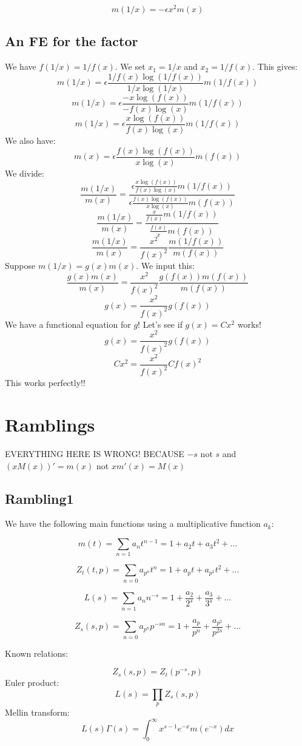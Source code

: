 \documentclass[a4paper]{amsart}
\begin{document}
$$m(1/x) = -\epsilon x^2 m(x)$$


\subsection{An FE for the factor}

We have $f(1/x) = 1/f(x)$. We set $x_1 = 1/x$ and $x_2 = 1/f(x)$. This gives:
$$m(1/x) = \epsilon\frac{1/f(x)\log(1/f(x))}{1/x\log(1/x)}m(1/f(x))$$
$$m(1/x) = \epsilon\frac{-x\log(f(x))}{-f(x)\log(x)}m(1/f(x))$$
$$m(1/x) = \epsilon\frac{x\log(f(x))}{f(x)\log(x)}m(1/f(x))$$
We also have:
$$m(x) = \epsilon\frac{f(x)\log(f(x))}{x\log(x)} m(f(x))$$
We divide:
$$\frac{m(1/x)}{m(x)} = \frac{\epsilon\frac{x\log(f(x))}{f(x)\log(x)}m(1/f(x))}{\epsilon\frac{f(x)\log(f(x))}{x\log(x)} m(f(x))}$$
$$\frac{m(1/x)}{m(x)} = \frac{\frac{x}{f(x)}m(1/f(x))}{\frac{f(x)}{x} m(f(x))}$$
$$\frac{m(1/x)}{m(x)} = \frac{x^2}{f(x)^2} \frac{m(1/f(x))}{m(f(x))}$$
Suppose $m(1/x) = g(x)m(x)$. We input this:
$$\frac{g(x)m(x)}{m(x)} = \frac{x^2}{f(x)^2} \frac{g(f(x))m(f(x))}{m(f(x))}$$
$$g(x) = \frac{x^2}{f(x)^2} g(f(x))$$
We have a functional equation for $g$! Let's see if $g(x) = Cx^2$ works!
$$g(x) = \frac{x^2}{f(x)^2} g(f(x))$$
$$Cx^2 = \frac{x^2}{f(x)^2} Cf(x)^2$$
This works perfectly!!

\section{Ramblings}

EVERYTHING HERE IS WRONG! BECAUSE $-s$ not $s$ and $(xM(x))' = m(x)$ not $xm'(x) = M(x)$


\subsection{Rambling1}

We have the following main functions using a multiplicative function $a_k$:

$$m(t) = \sum_{n = 1} a_nt^{n - 1} = 1 + a_2t + a_3t^2 + \ldots$$

$$Z_t(t, p) = \sum_{n = 0} a_{p^n} t^n = 1 + a_pt + a_{p^2}t^2 + \ldots$$

$$L(s) = \sum_{n = 1} a_n n^{-s} = 1 + \frac{a_2}{2^s} + \frac{a_3}{3^s} + \ldots$$

$$Z_s(s, p) = \sum_{n = 0} a_{p^n} p^{-sn} = 1 + \frac{a_p}{p^n} + \frac{a_{p^2}}{p^{2s}} + \ldots$$

Known relations:

$$Z_s(s, p) = Z_t(p^{-s}, p)$$
Euler product:
$$L(s) = \prod_p Z_s(s, p)$$
Mellin transform:
$$L(s)\Gamma(s) = \int_0^{\infty} x^{s - 1} e^{-x} m(e^{-x})dx$$
\end{document}
